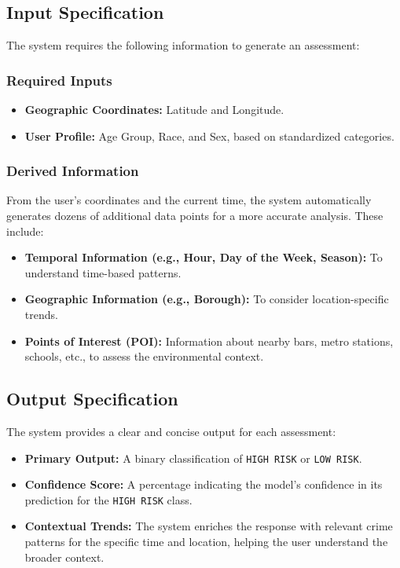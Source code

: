 \documentclass[11pt]{article}
\begin{document}
\subsection{Input Specification}
The system requires the following information to generate an assessment:

\subsubsection{Required Inputs}
\begin{itemize}[leftmargin=*]
\item \textbf{Geographic Coordinates:} Latitude and Longitude.
\item \textbf{User Profile:} Age Group, Race, and Sex, based on standardized categories.
\end{itemize}

\subsubsection{Derived Information}
From the user's coordinates and the current time, the system automatically generates dozens of additional data points for a more accurate analysis. These include:
\begin{itemize}[leftmargin=*]
\item \textbf{Temporal Information (e.g., Hour, Day of the Week, Season):} To understand time-based patterns.
\item \textbf{Geographic Information (e.g., Borough):} To consider location-specific trends.
\item \textbf{Points of Interest (POI):} Information about nearby bars, metro stations, schools, etc., to assess the environmental context.
\end{itemize}

\subsection{Output Specification}
The system provides a clear and concise output for each assessment:
\begin{itemize}[leftmargin=*]
\item \textbf{Primary Output:} A binary classification of \texttt{HIGH RISK} or \texttt{LOW RISK}.
\item \textbf{Confidence Score:} A percentage indicating the model's confidence in its prediction for the \texttt{HIGH RISK} class.
\item \textbf{Contextual Trends:} The system enriches the response with relevant crime patterns for the specific time and location, helping the user understand the broader context.
\end{itemize}
\end{document}
